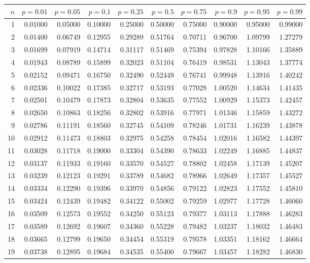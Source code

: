 \begin{center}
    \small
    \begin{tabular}{|r|rrr|rrr|rrr|}
        \hline
        $n$&$p=0.01$&$p=0.05$&$p=0.1$&$p=0.25$&$p=0.5$&$p=0.75$&$p=0.9$&$p=0.95$&$p=0.99$\\
        \hline
        1&0.01000&0.05000&0.10000&0.25000&0.50000&0.75000&0.90000&0.95000&0.99000\\
        2&0.01400&0.06749&0.12955&0.29289&0.51764&0.70711&0.96700&1.09799&1.27279\\
        3&0.01699&0.07919&0.14714&0.31117&0.51469&0.75394&0.97828&1.10166&1.35889\\
        4&0.01943&0.08789&0.15899&0.32023&0.51104&0.76419&0.98531&1.13043&1.37774\\
        5&0.02152&0.09471&0.16750&0.32490&0.52449&0.76741&0.99948&1.13916&1.40242\\
        6&0.02336&0.10022&0.17385&0.32717&0.53193&0.77028&1.00520&1.14634&1.41435\\
        7&0.02501&0.10479&0.17873&0.32804&0.53635&0.77552&1.00929&1.15373&1.42457\\
        8&0.02650&0.10863&0.18256&0.32802&0.53916&0.77971&1.01346&1.15859&1.43272\\
        9&0.02786&0.11191&0.18560&0.32745&0.54109&0.78246&1.01731&1.16239&1.43878\\
        10&0.02912&0.11473&0.18803&0.32975&0.54258&0.78454&1.02016&1.16582&1.44397\\
        11&0.03028&0.11718&0.19000&0.33304&0.54390&0.78633&1.02249&1.16885&1.44837\\
        12&0.03137&0.11933&0.19160&0.33570&0.54527&0.78802&1.02458&1.17139&1.45207\\
        13&0.03239&0.12123&0.19291&0.33789&0.54682&0.78966&1.02649&1.17357&1.45527\\
        14&0.03334&0.12290&0.19396&0.33970&0.54856&0.79122&1.02823&1.17552&1.45810\\
        15&0.03424&0.12439&0.19482&0.34122&0.55002&0.79259&1.02977&1.17728&1.46060\\
        16&0.03509&0.12573&0.19552&0.34250&0.55123&0.79377&1.03113&1.17888&1.46283\\
        17&0.03589&0.12692&0.19607&0.34360&0.55228&0.79482&1.03237&1.18032&1.46483\\
        18&0.03665&0.12799&0.19650&0.34454&0.55319&0.79578&1.03351&1.18162&1.46664\\
        19&0.03738&0.12895&0.19684&0.34535&0.55400&0.79667&1.03457&1.18282&1.46830\\

\end{tabular}
\end{center}
